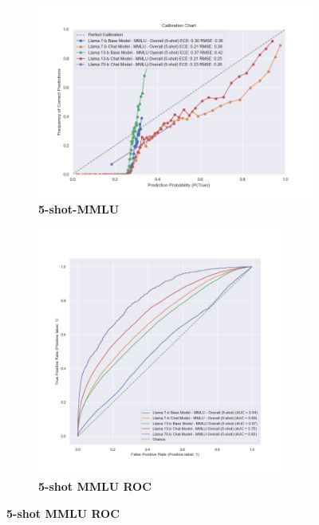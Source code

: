 \documentclass[11pt]{article}
\begin{document}
\begin{figure}
\begin{subfigure}[b]{0.38\textwidth}
    \end{subfigure}  
     \hfill
     \begin{subfigure}[b]{0.60\textwidth}
         \centering
         \includegraphics[width=1.1\textwidth]{figures/5-shot-MMLU.png}
         \caption{\textbf{5-shot-MMLU} }
         \label{fig:5-shot-MMLU}
     \end{subfigure}     
     \begin{subfigure}[b]{0.38\textwidth}
         \centering 
         \includegraphics[width=0.9\textwidth]{figures/5-shot-MMLU-roc.png}
         \caption{\textbf{5-shot MMLU ROC} }
         \label{fig:5-shot-MMLU-roc}
    \end{subfigure} 
    

\end{figure}
\end{document}
